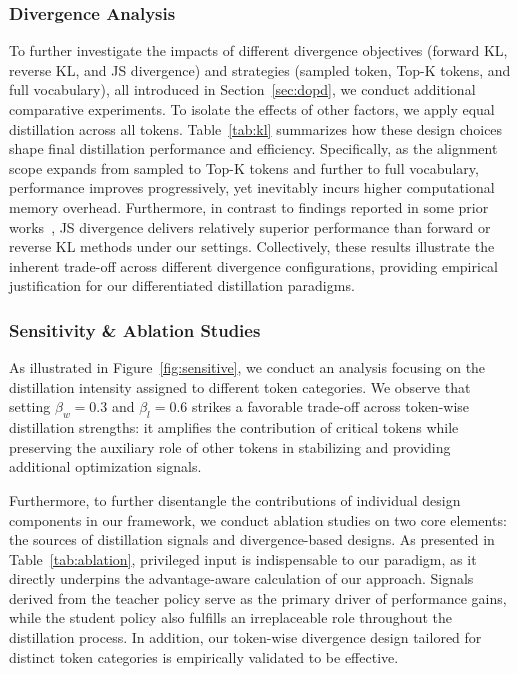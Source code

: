 \documentclass[]{jingdong}
\theoremstyle{plain}
\theoremstyle{definition}
\theoremstyle{remark}
\begin{document}
\subsubsection{Divergence Analysis}
To further investigate the impacts of different divergence objectives (forward KL, reverse KL, and JS divergence) and strategies (sampled token, Top-K tokens, and full vocabulary), all introduced in Section~\ref{sec:dopd}, we conduct additional comparative experiments.
To isolate the effects of other factors, we apply equal distillation across all tokens. Table~\ref{tab:kl} summarizes how these design choices shape final distillation performance and efficiency.
Specifically, as the alignment scope expands from sampled to Top-K tokens and further to full vocabulary, performance improves progressively, yet inevitably incurs higher computational memory overhead.
Furthermore, in contrast to findings reported in some prior works~\citep{zhao2026self,jin2026entropy}, JS divergence delivers relatively superior performance than forward or reverse KL methods under our settings.
Collectively, these results illustrate the inherent trade-off across different divergence configurations, providing empirical justification for our differentiated distillation paradigms.



\subsubsection{Sensitivity \& Ablation Studies}
As illustrated in Figure~\ref{fig:sensitive}, we conduct an analysis focusing on the distillation intensity assigned to different token categories. We observe that setting $\beta_{w}=0.3$ and $\beta_{l}=0.6$ strikes a favorable trade-off across token-wise distillation strengths: it amplifies the contribution of critical tokens while preserving the auxiliary role of other tokens in stabilizing and providing additional optimization signals.



Furthermore, to further disentangle the contributions of individual design components in our framework, we conduct ablation studies on two core elements: the sources of distillation signals and divergence-based designs.
As presented in Table~\ref{tab:ablation}, privileged input is indispensable to our paradigm, as it directly underpins the advantage-aware calculation of our approach. Signals derived from the teacher policy serve as the primary driver of performance gains, while the student policy also fulfills an irreplaceable role throughout the distillation process. In addition, our token-wise divergence design tailored for distinct token categories is empirically validated to be effective.
\end{document}
